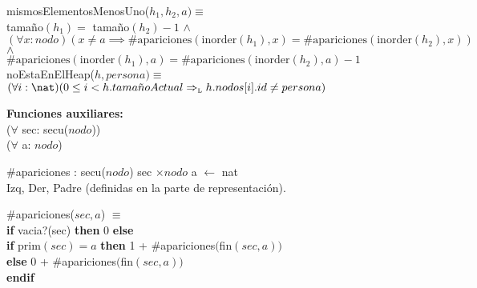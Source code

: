 \documentclass[../main.tex]{subfiles}
\begin{document}
\begin{interfaz}
mismosElementosMenosUno($h_1, h_2, a) \equiv$ \\
tamaño$(h_1) =$ tamaño$(h_2) - 1$ $\land$ \\
$(\forall x: nodo) (x \neq a \implies \#\text{apariciones}(\text{inorder}(h_1), x) = \#\text{apariciones}(\text{inorder}(h_2), x))$ $\land$ \\
$\#\text{apariciones}(\text{inorder}(h_1), a) = \#\text{apariciones}(\text{inorder}(h_2), a) - 1$
\\

noEstaEnElHeap($h, persona) \equiv$ \\
$(\forall i : \nat) (0 \leq i < h.tama\tilde{n}oActual \impluego h.nodos[i].id \neq persona)$

{\large\bfseries Funciones auxiliares: } \\
($\forall$ sec: secu($nodo$)) \\
($\forall$ a: $nodo$)

\#apariciones : secu($nodo$) sec $\times nodo$ a $\longleftarrow$ nat\\
Izq, Der, Padre (definidas en la parte de representación).

$\#$apariciones($sec, a$) $\equiv$ \\
\textbf{if} vacia?(sec) \textbf{then} 0 \textbf{else} \\
 \textbf{if} prim$(sec) = a$ \textbf{then} 1 + $\#$apariciones$($fin$(sec, a))$ \\
 \textbf{else} 0 + $\#$apariciones$($fin$(sec, a))$ \\
\textbf{endif}

\end{interfaz}
\end{document}

